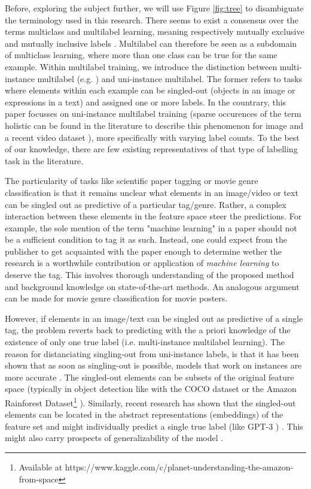 Before, exploring the subject further, we will use Figure \ref{fig:tree} to disambiguate the terminology used in this research. There seems to exist a consensus over the terms multiclass and multilabel learning, meaning respectively mutually exclusive and mutually inclusive labels . Multilabel can therefore be seen as a subdomain of multiclass learning, where more than one class can be true for the same example. Within multilabel training, we introduce the distinction between multi-instance multilabel (e.g. \cite{multiInstance}) and uni-instance multilabel. The former refers to tasks where elements within each example can be singled-out (objects in an image or expressions in a text) and assigned one or more labels. In the countrary, this paper focusses on uni-instance multilabel training (sparse occurences of the term holistic can be found in the literature to describe this phenomenon for image \cite{holisticImageDescriptors,holisticLungs} and a recent video dataset \cite{holisticVideoData} ), more specifically with varying label counts. To the best of our knowledge, there are few existing representatives of that type of labelling task in the literature.  

The particularity of tasks like scientific paper tagging or movie genre classification is that it remains unclear what elements in an image/video or text can be singled out as predictive of a particular tag/genre. Rather, a complex interaction between these elements in the feature space steer the predictions. For example, the sole mention of the term "machine learning" in a paper should not be a sufficient condition to tag it as such. Instead, one could expect from the publisher to get acquainted with the paper enough to determine wether the research is a worthwhile contribution or application of \emph{machine learning} to deserve the tag. This involves thorough understanding of the proposed method and background knowledge on state-of-the-art methods. An analogous argument can be made for movie genre classification for movie posters.

However, if elements in an image/text can be singled out as predictive of a single tag, the problem reverts back to predicting with the a priori knowledge of the existence of only one true label (i.e. multi-instance multilabel learning).  The reason for distanciating singling-out from uni-instance labels, is that it has been shown that as soon as singling-out is possible, models that work on instances are more accurate . The singled-out elements can be subsets of the original feature space (typically in object detection like with the COCO dataset  \cite{COCO} or the Amazon Rainforest Dataset\footnote{Available at https://www.kaggle.com/c/planet-understanding-the-amazon-from-space} ). Similarly, recent research has shown that the singled-out elements can be located in the abstract representations (embeddings) of the feature set and might individually predict a single true label (like GPT-3 ) . This might also carry prospects of generalizability of the model \cite{generalization} . 

